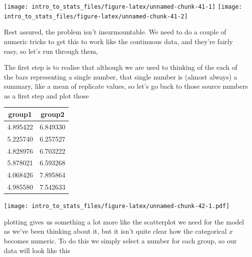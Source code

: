 \documentclass[
]{book}
\newenvironment{Shaded}{\begin{snugshade}}{\end{snugshade}}
\newcommand{\DataTypeTok}[1]{\textcolor[rgb]{0.13,0.29,0.53}{#1}}
\newcommand{\DecValTok}[1]{\textcolor[rgb]{0.00,0.00,0.81}{#1}}
\newcommand{\KeywordTok}[1]{\textcolor[rgb]{0.13,0.29,0.53}{\textbf{#1}}}
\newcommand{\NormalTok}[1]{#1}
\newcommand{\OperatorTok}[1]{\textcolor[rgb]{0.81,0.36,0.00}{\textbf{#1}}}
\newcommand{\StringTok}[1]{\textcolor[rgb]{0.31,0.60,0.02}{#1}}
\begin{document}
\texttt{[image: intro\_to\_stats\_files/figure-latex/unnamed-chunk-41-1]} \texttt{[image: intro\_to\_stats\_files/figure-latex/unnamed-chunk-41-2]}

Rest assured, the problem isn't insurmountable. We need to do a couple of numeric tricks to get this to work like the continuous data, and they're fairly easy, so let's run through them,

The first step is to realise that although we are used to thinking of the each of the bars representing a single number, that single number is (almost always) a summary, like a mean of replicate values, so let's go back to those source numbers as a first step and plot those

\begin{tabular}{c|c}
\hline
group1 & group2\\
\hline
4.895422 & 6.849330\\
\hline
5.225740 & 6.257527\\
\hline
4.828976 & 6.703222\\
\hline
5.878021 & 6.593268\\
\hline
4.068426 & 7.895864\\
\hline
4.985580 & 7.542633\\
\hline
\end{tabular}

\texttt{[image: intro\_to\_stats\_files/figure-latex/unnamed-chunk-42-1.pdf]}

plotting gives us something a lot more like the scatterplot we need for the model as we've been thinking about it, but it isn't quite clear how the categorical \(x\) becomes numeric. To do this we simply select a number for each group, so our data will look like this

\begin{Shaded}
\end{Shaded}
\end{document}
